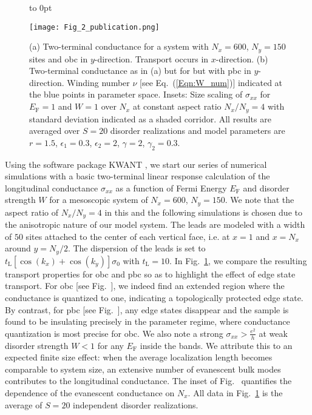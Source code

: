 \documentclass[aps,prb,amsmath,amssymb,twocolumn, superscriptaddress]{revtex4-2}
\newcommand{\eq}[1]{Eq.~(\ref{#1})}
\begin{document}
\begin{figure}[htp!]	 
{
    \vbox to 0pt {
            \raggedright
            \textcolor{white}{
            }
        }
}
{\texttt{[image: Fig\_2\_publication.png]}}
\caption{(a) Two-terminal conductance for a system with $N_x = 600$, $N_y = 150$ sites and \gls{obc} in $y$-direction. Transport occurs in $x$-direction. (b) Two-terminal conductance as in (a) but for but with \gls{pbc} in $y$-direction. Winding number $\nu$ [see \eq{Eqn:W_num}] indicated at the blue points in parameter space. Insets: Size scaling of $\sigma_{xx}$ for $E_\mathrm{F} = 1$ and $W = 1$ over $N_x$ at constant aspect ratio $N_x/N_y=4$ with standard deviation indicated as a shaded corridor. All results are averaged over $S = 20$ disorder realizations and model parameters are $r = 1.5$, $\epsilon_1 = 0.3$, $\epsilon_2 = 2$, $\gamma  =2$, $\gamma_2 = 0.3$.}\label{Fig:Transport}
\end{figure}

Using the software package KWANT \cite{Kwant, Kwant_Mumps, KPM_tools}, we start our series of numerical simulations with a basic two-terminal linear response calculation of the longitudinal conductance $\sigma_{xx}$ as a function of Fermi Energy $E_\mathrm{F}$ and disorder strength $W$ for a mesoscopic system of $N_x = 600$, $N_y = 150$. We note that the aspect ratio of $N_x/N_y=4$ in this and the following simulations is chosen due to the anisotropic nature of our model system. The leads are modeled with a width of $50$ sites attached to the center of each vertical face, i.e. at $x=1$ and $x=N_x$ around $y=N_y/2$. The dispersion of the leads is set to $t_\mathrm{L} [\cos(k_x)  + \cos(k_y)] \sigma_0$ with $t_\mathrm{L} = 10$. In Fig.~\ref{Fig:Transport}, we compare the resulting transport properties for \gls{obc} and \gls{pbc} so as to highlight the effect of edge state transport. For \gls{obc}  [see Fig.~], we indeed find an extended region where the conductance is quantized to one, indicating a topologically protected edge state. By contrast, for \gls{pbc} [see Fig.~], any edge states disappear and the sample is found to be insulating precisely in the parameter regime, where conductance quantization is most precise for \gls{obc}. We also note a strong $\sigma_{xx} > \frac{e^2}{h}$ at weak disorder strength $W<1$ for any $E_\mathrm{F}$ inside the bands. We attribute this to an expected finite size effect: when the average localization length becomes comparable to system size, an extensive number of evanescent bulk modes contributes to the longitudinal conductance. The inset of Fig.~ quantifies the dependence of the evanescent conductance on $N_x$. All data in Fig.~\ref{Fig:Transport} is the average of $S = 20$ independent disorder realizations.
\end{document}
